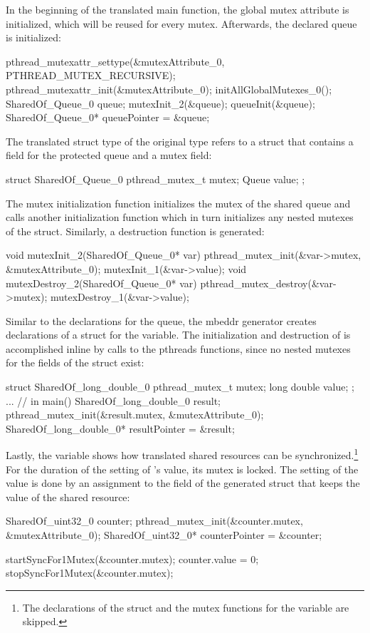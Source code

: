 In the beginning of the translated main function, the global mutex attribute is initialized, which will be reused for every mutex. Afterwards, the declared queue is initialized:
\begin{ccode}
pthread_mutexattr_settype(&mutexAttribute_0, PTHREAD_MUTEX_RECURSIVE); 
pthread_mutexattr_init(&mutexAttribute_0); 
initAllGlobalMutexes_0(); 
SharedOf_Queue_0 queue; 
mutexInit_2(&queue); 
queueInit(&queue); 
SharedOf_Queue_0* queuePointer = &queue;
\end{ccode}
The translated struct type  of the original type  refers to a struct that contains a field for the protected queue and a mutex field:
\begin{ccode}
struct SharedOf_Queue_0 { 
  pthread_mutex_t mutex; 
  Queue value; 
};
\end{ccode}
The mutex initialization function  initializes the mutex of the shared queue and calls another initialization function which in turn initializes any nested mutexes of the  struct. Similarly, a destruction function is generated:
\begin{ccode}
void mutexInit_2(SharedOf_Queue_0* var) { 
  pthread_mutex_init(&var->mutex, &mutexAttribute_0); 
  mutexInit_1(&var->value); 
}
void mutexDestroy_2(SharedOf_Queue_0* var) { 
  pthread_mutex_destroy(&var->mutex);
  mutexDestroy_1(&var->value); 
}      
\end{ccode}
Similar to the declarations for the queue, the mbeddr generator creates declarations of a struct for the  variable. The initialization and destruction of  is accomplished inline by calls to the pthreads functions, since no nested mutexes for the fields of the struct exist:
\begin{ccode}
struct SharedOf_long_double_0 { 
  pthread_mutex_t mutex; 
  long double value; 
};
... // in main()
SharedOf_long_double_0 result; 
pthread_mutex_init(&result.mutex, &mutexAttribute_0); 
SharedOf_long_double_0* resultPointer = &result;
\end{ccode}
Lastly, the  variable shows how translated shared resources can be synchronized.\footnote{The declarations of the struct and the mutex functions for the  variable are skipped.} For the duration of the setting of 's value, its mutex is locked. The setting of the value is done by an assignment to the  field of the generated struct that keeps the value of the shared resource:
\begin{ccode}
SharedOf_uint32_0 counter; 
pthread_mutex_init(&counter.mutex, &mutexAttribute_0); 
SharedOf_uint32_0* counterPointer = &counter;

startSyncFor1Mutex(&counter.mutex); 
{ counter.value = 0; } 
stopSyncFor1Mutex(&counter.mutex);
\end{ccode}

